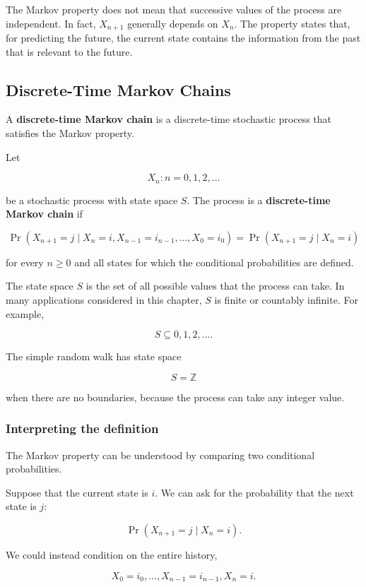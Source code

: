 \documentclass[
  letterpaper,
  DIV=11,
  numbers=noendperiod]{scrartcl}
\theoremstyle{definition}
\theoremstyle{remark}
\begin{document}
The Markov property does not mean that successive values of the process
are independent. In fact, \(X_{n+1}\) generally depends on \(X_n\). The
property states that, for predicting the future, the current state
contains the information from the past that is relevant to the future.

\subsection{Discrete-Time Markov
Chains}\label{discrete-time-markov-chains}

A \textbf{discrete-time Markov chain} is a discrete-time stochastic
process that satisfies the Markov property.

Let

\[
{X_n:n=0,1,2,\ldots}
\]

be a stochastic process with state space \(S\). The process is a
\textbf{discrete-time Markov chain} if

\[
\boxed{
\Pr(X_{n+1}=j\mid X_n=i,X_{n-1}=i_{n-1},\ldots,X_0=i_0)
=\Pr(X_{n+1}=j\mid X_n=i)
}
\]

for every \(n\geq 0\) and all states for which the conditional
probabilities are defined.

The state space \(S\) is the set of all possible values that the process
can take. In many applications considered in this chapter, \(S\) is
finite or countably infinite. For example,

\[
S\subseteq{0,1,2,\ldots}.
\]

The simple random walk has state space

\[
S=\mathbb{Z}
\]

when there are no boundaries, because the process can take any integer
value.

\subsubsection{Interpreting the
definition}\label{interpreting-the-definition}

The Markov property can be understood by comparing two conditional
probabilities.

Suppose that the current state is \(i\). We can ask for the probability
that the next state is \(j\):

\[
\Pr(X_{n+1}=j\mid X_n=i).
\]

We could instead condition on the entire history,

\[
X_0=i_0,\ldots,X_{n-1}=i_{n-1},X_n=i.
\]
\end{document}
